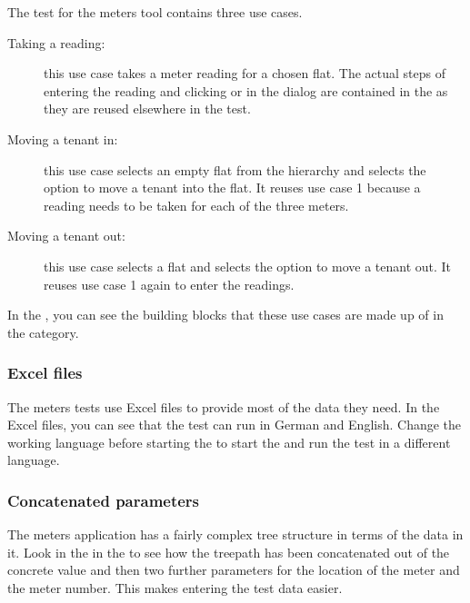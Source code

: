 

The test for the meters tool contains three use cases. 
\begin{description}
\item [Taking a reading:]{ this use case takes a meter reading for a chosen flat. The actual steps of entering the reading and clicking  or  in the dialog are contained in the \gdcase{}  as they are reused elsewhere in the test.}
\item [Moving a tenant in:]{ this use case selects an empty flat from the hierarchy and selects the option to move a tenant into the flat. It reuses use case 1 because a reading needs to be taken for each of the three meters.}
\item [Moving a tenant out:]{ this use case selects a flat and selects the option to move a tenant out. It reuses use case 1 again to enter the readings. } 
\end{description}

In the  \gdproject{}, you can see the building blocks that these use cases are made up of in the  category. 

\subsubsection{Excel files}
The meters tests use Excel files to provide most of the data they need. In the Excel files, you can see that the test can run in German and English. Change the working language before starting the \gdaut{} to start the \gdaut{} and run the test in a different language. 


\subsubsection{Concatenated parameters}
The meters application has a fairly complex tree structure in terms of the data in it. Look in the \gdcase{}  in the  \gdproject{} to see how the treepath has been concatenated out of the concrete value  and then two further parameters for the location of the meter and the meter number. This makes entering the test data easier. 
